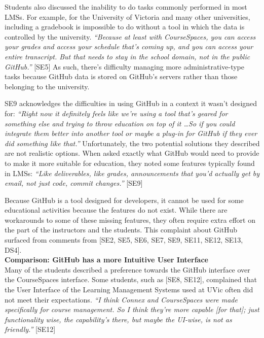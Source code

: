Students also discussed the inability to do tasks commonly performed in most LMSs. For example, for the University of Victoria and many other universities, including a gradebook is impossible to do without a tool in which the data is controlled by the university. \textit{``Because at least with CourseSpaces, you can access your grades and access your schedule that's coming up, and you can access your entire transcript. But that needs to stay in the school domain, not in the public GitHub.''} [SE5] As such, there's difficulty managing more administrative-type tasks because GitHub data is stored on GitHub's servers rather than those belonging to the university.


SE9 acknowledges the difficulties in using GitHub in a context it wasn't designed for: \textit{``Right now it definitely feels like we're using a tool that's geared for something else and trying to throw education on top of it \ldots So if you could integrate them better into another tool or maybe a plug-in for GitHub if they ever did something like that.''} Unfortunately, the two potential solutions they described are not realistic options. When asked exactly what GitHub would need to provide to make it more suitable for education, they noted some features typically found in LMSs: \textit{``Like deliverables, like grades, announcements that you'd actually get by email, not just code, commit changes.''} [SE9]

Because GitHub is a tool designed for developers, it cannot be used for some educational activities because the features do not exist. While there are workarounds to some of these missing features, they often require extra effort on the part of the instructors and the students. This complaint about GitHub surfaced from comments from [SE2, SE5, SE6, SE7, SE9, SE11, SE12, SE13, DS4]. \\

\textbf{Comparison: GitHub has a more Intuitive User Interface} \\
Many of the students described a preference towards the GitHub interface over the CourseSpaces interface. Some students, such as [SE8, SE12], complained that the User Interface of the Learning Management Systems used at UVic often did not meet their expectations. \textit{``I think Connex and CourseSpaces were made specifically for course management. So I think they're more capable [for that]; just functionality wise, the capability's there, but maybe the UI-wise, is not as friendly.''} [SE12]

